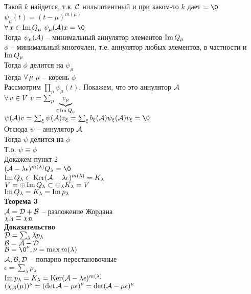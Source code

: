 \documentclass[12pt]{article}
\begin{document}
Такой $k$ найдется, т.к. $\mcC$ нильпотентный и при каком-то $k$ дает $= \0$\\
$\psi_\mu (t) = (t-\mu)^{m(\mu)}$\\
$\fall x \in \im Q_\mu\ \psi_\mu(\mcA)x = \0$\\
Тогда $\psi_\mu(\mcA)$ -- минимальный аннулятор элементов $\im Q_\mu$\\
$\phi$ -- минимальный многочлен, т.е. аннулятор любых элементов, в частности и $\im Q_\mu$\\
Тогда $\phi$ делится на $\psi_\mu$\\
Тогда $\fall \mu\ \mu$ -- корень $\phi$\\
Рассмотрим $\prod_\mu \psi_\mu (t)$. Покажем, что это аннулятор $\mcA$\\
$\fall v \in V\ v = \sum_\mu \ub{\in \im Q_\mu}{v_\mu}$\\
$\psi(\mcA)v = \sum_\xi \psi(\mcA)v_\xi = \sum_\xi b_\xi(\mcA)\psi_\xi(\mcA)v_\xi = \0$\\
Отсюда $\psi$ -- аннулятор $\mcA$\\
Тогда $\psi$ делится на $\phi$\\
Т.о. $\psi \equiv \phi$\\
Докажем пункт 2\\
$(\mcA - \lambda \epsilon)^{m(\lambda)}Q_\lambda = \0$\\
$\im Q_\lambda \subset \ker (\mcA - \lambda\epsilon)^{m(\lambda)} = K_\lambda$\\
$V = \oplus \im Q_\lambda \subset \oplus_\lambda K_\lambda = V$\\
$\im Q_\lambda = K_\lambda = \im p_\lambda$\\
\textbf{Теорема 3}\\
$\mcA = \mcD + \mcB$ -- разложение Жордана\\
$\chi_\mcA \equiv \chi_\mcD$\\
\textbf{Доказательство}\\
$\mcD = \sum_\lambda \lambda p_\lambda$\\
$\mcB = \mcA - \mcD$\\
$\mcB = \0^\nu, \nu = \max m(\lambda)$\\
$\mcA,\mcB,\mcD$ -- попарно перестановочные\\
$\epsilon = \sum_\lambda \rho_\lambda$\\
$\im p_\lambda = K_\lambda = \ker (\mcA - \lambda \epsilon)^{m(\lambda)}$\\
$(\chi_\mcA(\mu))^\nu = (\det \mcA - \mu \epsilon)^\nu = \det (\mcA - \mu \epsilon)^\nu$\\
\end{document}
